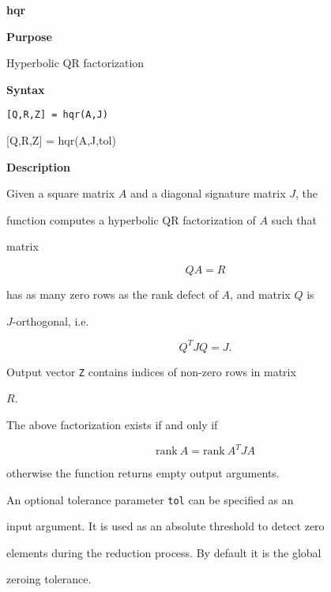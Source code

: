 \documentclass[12pt,a4paper]{article}
\begin{document}
{\Huge \textbf{hqr}}

\bigskip

\bigskip



{\Large \textbf{Purpose}}



Hyperbolic QR factorization

\bigskip



{\Large \textbf{Syntax}}



{\tt [Q,R,Z] = hqr(A,J)



[Q,R,Z] = hqr(A,J,tol)}

\bigskip



{\Large \textbf{Description}}



Given a square matrix $A$ and a diagonal signature matrix $J$, the

function computes a hyperbolic QR factorization of $A$ such that

matrix

\[

QA = R

\]

has as many zero rows as the rank defect of $A$, and matrix $Q$ is

$J$-orthogonal, i.e.

\[

Q^T J Q = J.

\]

Output vector {\tt Z} contains indices of non-zero rows in matrix

$R$.



The above factorization exists if and only if

\[

\mathrm{rank}\:A = \mathrm{rank}\: A^T J A

\]

otherwise the function returns empty output arguments.



An optional tolerance parameter {\tt tol} can be specified as an

input argument. It is used as an absolute threshold to detect zero

elements during the reduction process. By default it is the global

zeroing tolerance.
\end{document}
